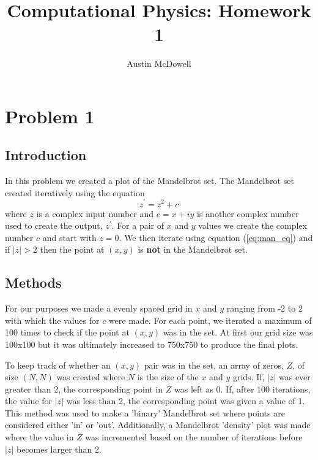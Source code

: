 \documentclass[11pt]{article}
\title{Computational Physics: Homework 1 }
\author{Austin McDowell}
\begin{document}
\maketitle

\section*{Problem 1}
\subsection*{Introduction}
In this problem we created a plot of the Mandelbrot set. The Mandelbrot set created iteratively using the equation
\begin{equation}
\label{eq:man_eq}
z^\prime = z^2 + c
\end{equation}
where $z$ is a complex input number and $c = x + iy$ is another complex number used to create the output, $z^\prime$. For a pair of $x$ and $y$ values we create the complex number $c$ and start with $z=0$. We then iterate using equation (\ref{eq:man_eq}) and if $|z|>2$ then the point at $(x,y)$ is \textbf{not} in the Mandelbrot set. 

\subsection*{Methods}
For our purposes we made a evenly spaced grid in $x$ and $y$ ranging from -2 to 2 with which the values for $c$ were made. For each point, we iterated a maximum of 100 times to check if the point at $(x,y)$ was in the set. At first our grid size was 100x100 but it was ultimately increased to 750x750 to produce the final plots.

To keep track of whether an $(x,y)$ pair was in the set, an array of zeros, $Z$, of size $(N,N)$ was created where $N$ is the size of the $x$ and $y$ grids. If, $|z|$ was ever greater than 2, the corresponding point in $Z$ was left as 0. If, after 100 iterations, the value for $|z|$ was less than 2, the corresponding point was given a value of 1. This method was used to make a 'binary' Mandelbrot set where points are considered either 'in' or 'out'. Additionally, a Mandelbrot 'density' plot was made where the value in $Z$ was incremented based on the number of iterations before $|z|$ becomes larger than 2. 
\end{document}
